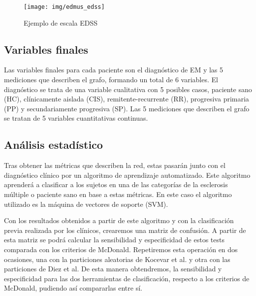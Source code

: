 \documentclass[fleqn,12pt]{uicarticle} %
\begin{document}
\begin{figure}[b]
	\centering
	\texttt{[image: img/edmus\_edss]}
	\vspace{5mm} 
	\caption{Ejemplo de escala EDSS}
	\label{fig:edss}
\end{figure}

\subsection{Variables finales}

Las variables finales para cada paciente son el diagnóstico de EM y las 5 mediciones que describen el grafo, formando un total de 6 variables. El diagnóstico se trata de una variable cualitativa con 5 posibles casos, paciente sano (HC), clínicamente aislada (CIS), remitente-recurrente (RR), progresiva primaria (PP) y secundariamente progresiva (SP). Las 5 mediciones que describen el grafo se tratan de 5 variables cuantitativas continuas.

\subsection{Análisis estadístico}
Tras obtener las métricas que describen la red, estas pasarán junto con el diagnóstico clínico por un algoritmo de aprendizaje automatizado. Este algoritmo aprenderá a clasificar a los sujetos en una de las categorías de la esclerosis múltiple o paciente sano en base a estas métricas. En este caso el algoritmo utilizado es la máquina de vectores de soporte (SVM).

Con los resultados obtenidos a partir de este algoritmo y con la clasificación previa realizada por los clínicos, crearemos una matriz de confusión. A partir de esta matriz se podrá calcular la sensibilidad y especificidad de estos tests comparada con los criterios de McDonald. Repetiremos esta operación en dos ocasiones, una con la particiones aleatorias de Kocevar et al. y otra con las particiones de Diez et al. De esta manera obtendremos, la sensibilidad y especificidad para las dos herramientas de clasificación, respecto a los criterios de McDonald, pudiendo así compararlas entre sí. 
\end{document}
